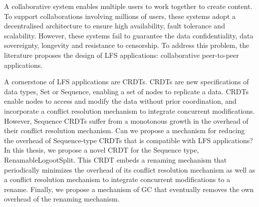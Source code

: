 \begin{ThesisAbstract}
\begin{FrenchAbstract}
    \end{FrenchAbstract}
    \begin{EnglishAbstract}
        A collaborative system enables multiple users to work together to create content.
        To support collaborations involving millions of users, these systems adopt a decentralised architecture to ensure high availability, fault tolerance and scalability.
        However, these systems fail to guarantee the data confidentiality, data sovereignty, longevity and resistance to censorship.
        To address this problem, the literature proposes the design of \acf{LFS} applications: collaborative peer-to-peer applications.

        A cornerstone of LFS applications are \acfp{CRDT}.
        \acp{CRDT} are new specifications of data types, \eg Set or Sequence, enabling a set of nodes to replicate a data.
        \acp{CRDT} enable nodes to access and modify the data without prior coordination, and incorporate a conflict resolution mechanism to integrate concurrent modifications.
        However, Sequence \acp{CRDT} suffer from a monotonous growth in the overhead of their conflict resolution mechanism.
        Can we propose a mechanism for reducing the overhead of Sequence-type CRDTs that is compatible with LFS applications?
        In this thesis, we propose a novel \ac{CRDT} for the Sequence type, RenamableLogootSplit.
        This \ac{CRDT} embeds a renaming mechanism that periodically minimizes the overhead of its conflict resolution mechanism as well as a conflict resolution mechanism to integrate concurrent modifications to a rename.
        Finally, we propose a mechanism of \acf{GC} that eventually removes the own overhead of the renaming mechanism.
    \end{EnglishAbstract}
\end{ThesisAbstract}
